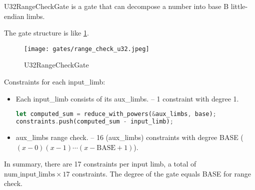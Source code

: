 
\hspace*{\fill}

\indent U32RangeCheckGate is a gate that can decompose a number into base B little-endian limbs.

The gate structure is like \ref{fig:range-check-u32}.

\begin{figure}[!ht]
    \centering
    \texttt{[image: gates/range\_check\_u32.jpeg]}
    \caption{U32RangeCheckGate}
    \label{fig:range-check-u32}
\end{figure}

Constraints for each input\_limb:
\begin{itemize}
    \item Each input\_limb consists of its aux\_limbs. -- 1 constraint with degree 1.
    \begin{lstlisting}[language=rust]
let computed_sum = reduce_with_powers(&aux_limbs, base);
constraints.push(computed_sum - input_limb);
    \end{lstlisting}
    \item aux\_limbs range check. -- 16 (aux\_limbs) constraints with degree BASE ($(x-0)(x-1)\cdots(x-\text{BASE}+1)$).
\end{itemize}

In summary, there are 17 constraints per input limb, a total of $\text{num\_input\_limbs} \times 17$ constraints. 
The degree of the gate equals BASE for range check.
